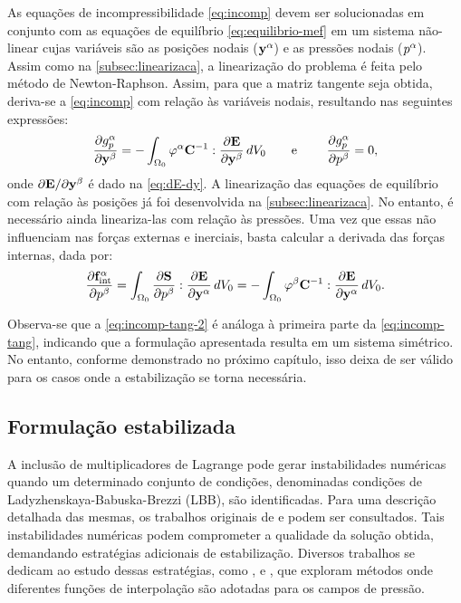 \documentclass[Tese.tex]{subfiles}
\begin{document}
As equações de incompressibilidade \eqref{eq:incomp} devem ser solucionadas em conjunto com as equações de equilíbrio \eqref{eq:equilibrio-mef} em um sistema não-linear cujas variáveis são as posições nodais ($\mathbf{y}^\alpha$) e as pressões nodais ($p^\alpha$). Assim como na \autoref{subsec:linearizaca}, a linearização do problema é feita pelo método de Newton-Raphson. Assim, para que a matriz tangente seja obtida, deriva-se a \cref{eq:incomp} com relação às variáveis nodais, resultando nas seguintes expressões:
\begin{equation}\label{eq:incomp-tang}
\dfrac{\partial {g}_{p}^\alpha}{\partial \mathbf{y}^\beta} = -\int_{\Omega_0}\varphi^\alpha\mathbf{C}^{-1}:\dfrac{\partial\mathbf{E}}{\partial\mathbf{y}^\beta}\,dV_0 \text{\qquad e \qquad} \dfrac{\partial {g}_{p}^\alpha}{\partial p^\beta} = 0,
\end{equation}
onde ${\partial\mathbf{E}}/{\partial\mathbf{y}^\beta}$ é dado na \cref{eq:dE-dy}. A linearização das equações de equilíbrio com relação às posições já foi desenvolvida na \autoref{subsec:linearizaca}. No entanto, é necessário ainda lineariza-las com relação às pressões. Uma vez que essas não influenciam nas forças externas e inerciais, basta calcular a derivada das forças internas, dada por:
\begin{equation}\label{eq:incomp-tang-2}
\dfrac{\partial \mathbf{f}_\text{int}^\alpha}{\partial p^\beta} = \int_{\Omega_0}\dfrac{\partial \mathbf{S}}{\partial p^\beta}:\dfrac{\partial\mathbf{E}}{\partial\mathbf{y}^\alpha}\,dV_0 = -\int_{\Omega_0}\varphi^\beta\mathbf{C}^{-1}:\dfrac{\partial\mathbf{E}}{\partial\mathbf{y}^\alpha}\,dV_0.
\end{equation}

Observa-se que a \cref{eq:incomp-tang-2} é análoga à primeira parte da \cref{eq:incomp-tang}, indicando que a formulação apresentada resulta em um sistema simétrico. No entanto, conforme demonstrado no próximo capítulo, isso deixa de ser válido para os casos onde a estabilização se torna necessária.

\subsection{Formulação estabilizada}

A inclusão de multiplicadores de Lagrange pode gerar instabilidades numéricas quando um determinado conjunto de condições, denominadas condições de Ladyzhenskaya-Babuska-Brezzi (LBB), são identificadas. Para uma descrição detalhada das mesmas, os trabalhos originais de  e  podem ser consultados. Tais instabilidades numéricas podem comprometer a qualidade da solução obtida, demandando estratégias adicionais de estabilização. Diversos trabalhos se dedicam ao estudo dessas estratégias, como ,  e , que exploram métodos onde diferentes funções de interpolação são adotadas para os campos de pressão. 
\end{document}
